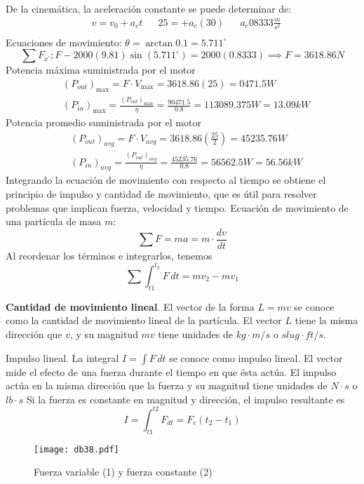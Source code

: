 De la cinemática, la aceleración constante
se puede determinar de:
\begin{align*}
    &v = v_0 +  a_ct&&25 = + a_c(30)&& a_c 08333 \frac{m}{s^2}\\
\end{align*}
Ecuaciones de movimiento: $\theta=\arctan{0.1}=5.711^{\circ}$
\begin{equation*}
    \sum F_{x^{\prime}}; F - 2000(9.81)\sin{(5.711^{\circ})} = 2000(0.8333)\implies F = 3618.86N
\end{equation*}
Potencia máxima suministrada por el motor
\begin{align*}
    &(P_{out})_{\max} = F\cdot V_{\max} = 3618.86(25) = 0471.5W\\
    &(P_{in})_{\max} = \frac{(P_{out})_{\max}}{\eta} = \frac{90471.5}{0.8} = 113089.375W = 13.09kW
\end{align*}
Potencia promedio suministrada por el motor
\begin{align*}
    &\left(P_{out}\right)_{avg} = F\cdot V_{avg} = 3618.86\left(\frac{25}{2}\right) = 45235.76W\\
    &\left(P_{in}\right)_{avg} = \frac{\left(P_{out}\right)_{avg}}{\eta} = \frac{45235.76}{0.8} = 56562.5W = 56.56kW
\end{align*}
Integrando la ecuación de movimiento con
respecto al tiempo se obtiene el principio de
impulso y cantidad de movimiento, que es útil
para resolver problemas que implican fuerza,
velocidad y tiempo.
Ecuación de movimiento de una partícula de
masa $m$:
\begin{equation*}
    \sum F =ma =m\cdot \frac{dv}{dt}
\end{equation*}
Al reordenar los términos e integrarlos, tenemos
\begin{equation*}
    \sum \int_{t1}^{t_2}F\, dt =mv_2- mv_1
\end{equation*}

\textbf{Cantidad de movimiento lineal}. El vector de la
forma $L=mv$ se conoce como la cantidad de
movimiento lineal de la partícula. El vector $L$
tiene la misma dirección que $v$, y su magnitud
$mv$ tiene unidades de $kg \cdot m/s$ o $slug\cdot  ft/s$.

Impulso lineal. La integral $I=\int F\,dt$ se conoce
como impulso lineal. El vector mide el efecto de
una fuerza durante el tiempo en que ésta actúa.
El impulso actúa en la misma dirección que la
fuerza y su magnitud tiene unidades de $N\cdot s$ o $lb\cdot s$
Si la fuerza es constante en magnitud y dirección,
el impulso resultante es
\begin{equation*}
    I =\int_{t1}^{t2}F_{dt} =F_c\left(t_2 - t_1\right)
\end{equation*}
\begin{figure}[h!]
\centering
  \texttt{[image: db38.pdf]}
  \caption{Fuerza variable (1) y fuerza constante (2)}
  \label{db38}
\end{figure}


